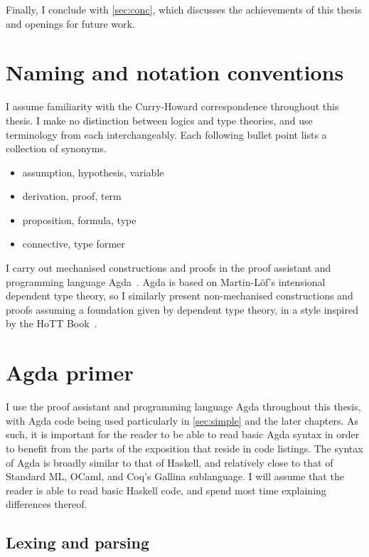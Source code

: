 Finally, I conclude with \cref{sec:conc}, which discusses the achievements of
this thesis and openings for future work.

\section{Naming and notation conventions}

I assume familiarity with the Curry-Howard correspondence throughout this
thesis.
I make no distinction between logics and type theories, and use terminology from
each interchangeably.
Each following bullet point lists a collection of synonyms.

\begin{itemize}
  \item assumption, hypothesis, variable
  \item derivation, proof, term
  \item proposition, formula, type
  \item connective, type former
\end{itemize}

I carry out mechanised constructions and proofs in the proof assistant and
programming language Agda~\citep{Agda}.
Agda is based on Martin-L\"{o}f's intensional dependent type theory, so I
similarly present non-mechanised constructions and proofs assuming a foundation
given by dependent type theory, in a style inspired by the HoTT
Book~\citep{hottbook}.

\section{Agda primer}

I use the proof assistant and programming language Agda throughout this thesis,
with Agda code being used particularly in \cref{sec:simple} and the later
chapters.
As such, it is important for the reader to be able to read basic Agda syntax in
order to benefit from the parts of the exposition that reside in code listings.
The syntax of Agda is broadly similar to that of Haskell, and relatively close
to that of Standard ML, OCaml, and Coq's Gallina sublanguage.
I will assume that the reader is able to read basic Haskell code, and spend most
time explaining differences thereof.

\subsection{Lexing and parsing}

